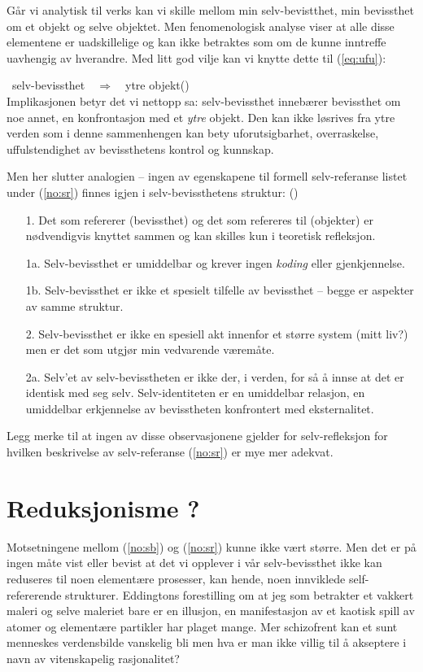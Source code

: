 \documentclass[10pt,twocolumn]{article}
\newcounter{EQ}
\newcommand{\equ}[1]{\refstepcounter{EQ}\vspace{.5ex}\par\noindent\ 
    \hfill #1\hfill{(\theEQ)}\\[.5ex]}
\newcommand{\refp}[1]{(\ref{#1})}
\newcommand{\<}{\langle}
\renewcommand{\>}{\rangle}
\newcommand{\MyLPar}{\parsep -.2ex plus.2ex minus.2ex\itemsep\parsep
   \vspace{-\topsep}\vspace{.5ex}}
\begin{document}
G{\aa}r vi analytisk til verks kan vi skille mellom min 
selv-bevistthet, min
bevissthet om et objekt og selve objektet. Men fenomenologisk analyse viser 
at alle disse elementene er uadskillelige
og kan ikke betraktes som om de kunne inntreffe uavhengig av 
hverandre. 
%
Med litt god vilje kan vi knytte dette til \refp{eq:ufu}: 
\equ{selv-bevissthet\ \ $\Rightarrow$\ \ ytre objekt}
%
Implikasjonen betyr det vi nettopp sa: selv-be\-visst\-het inneb{\ae}rer bevissthet
om noe annet, en 
konfrontasjon med et {\em ytre} objekt. Den kan ikke
l{\o}s\-ri\-ves fra ytre verden som i denne
sammenhengen kan bety uforutsigbarhet, overraskelse, uffulstendighet
av bevissthetens kontrol og kunnskap.

Men her slutter analogien -- ingen av egenskapene
til formell selv-referanse listet under \refp{no:sr} finnes igjen i 
selv-bevissthetens struktur: 
\hfill{(\theEQ)\label{no:sb}}
\begin{itemize}\MyLPar
\item[1.] Det som refererer (bevissthet) og det som refereres til 
(objekter) er n{\o}dvendigvis knyttet sammen og kan skilles kun i teoretisk 
refleksjon.
\item[1a.] Selv-bevissthet er umiddelbar og krever ingen {\em koding} 
eller gjenkjennelse.
\item[1b.] Selv-bevissthet er ikke et spesielt tilfelle av bevissthet 
 -- begge er aspekter av samme struktur.
\item[2.] Selv-bevissthet er ikke en spesiell akt innenfor et st{\o}rre 
system (mitt liv?) men er det som utgj{\o}r min vedvarende v{\ae}rem{\aa}te.
\item[2a.] Selv'et av selv-bevisstheten er ikke der, i verden, for s{\aa} {\aa} innse 
at det er identisk med seg selv. Selv-identiteten er en umiddelbar 
relasjon, en umiddelbar erkjennelse av bevisstheten konfrontert med 
eksternalitet.
\end{itemize}
Legg merke til at ingen av disse observasjonene gjelder for selv-refleksjon 
for hvilken beskrivelse av selv-referanse \refp{no:sr} 
er mye mer adekvat.

\section{Reduksjonisme ?}
Motsetningene mellom \refp{no:sb} og \refp{no:sr} kunne ikke v{\ae}rt st{\o}rre.
Men det er p{\aa} ingen m{\aa}te vist eller
bevist at det vi opplever i v{\aa}r selv-bevissthet ikke 
kan reduseres til noen element{\ae}re 
prosesser, kan hende, noen innviklede self-refererende strukturer.
Eddingtons forestilling om at jeg som betrakter et vakkert maleri og selve maleriet
bare er en illusjon, en manifestasjon av et kaotisk spill av atomer og 
element{\ae}re partikler har plaget mange. Mer 
schizofrent kan et sunt menneskes verdensbilde vanskelig bli men hva er 
man ikke villig til {\aa} akseptere i navn av vitenskapelig rasjonalitet?
\end{document}
